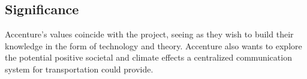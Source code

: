 \subsection{Significance}
Accenture's values coincide with the project, seeing as they wish to build their knowledge in the form of technology and theory. Accenture also wants to explore the potential positive societal and climate effects a centralized communication system for transportation could provide.